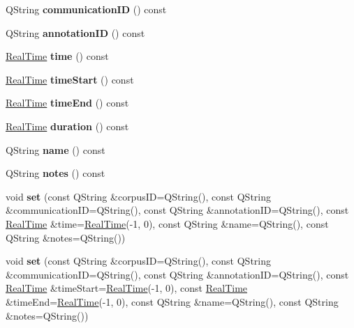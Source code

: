 \begin{DoxyCompactItemize}
Q\+String {\bfseries communication\+ID} () const
\item 
\mbox{\label{class_corpus_bookmark_ac10293f4e2033746d695c6349805fcba}} 
Q\+String {\bfseries annotation\+ID} () const
\item 
\mbox{\label{class_corpus_bookmark_a4567b01babc1074c21fd81fa4cf6b5bc}} 
\hyperlink{struct_real_time}{Real\+Time} {\bfseries time} () const
\item 
\mbox{\label{class_corpus_bookmark_a5954ecddfa90b9083ebca82ebf103d33}} 
\hyperlink{struct_real_time}{Real\+Time} {\bfseries time\+Start} () const
\item 
\mbox{\label{class_corpus_bookmark_ad4a33b45958e1a28eba0f659a94257f5}} 
\hyperlink{struct_real_time}{Real\+Time} {\bfseries time\+End} () const
\item 
\mbox{\label{class_corpus_bookmark_aecef3174b630fceda67dc4137f5ddcc4}} 
\hyperlink{struct_real_time}{Real\+Time} {\bfseries duration} () const
\item 
\mbox{\label{class_corpus_bookmark_a754ad425a41da641362b34452777c530}} 
Q\+String {\bfseries name} () const
\item 
\mbox{\label{class_corpus_bookmark_a08b19a694d6d4238342e09554eeb5735}} 
Q\+String {\bfseries notes} () const
\item 
\mbox{\label{class_corpus_bookmark_a3ad4e2e8fa63501f87b2f181bb125ddc}} 
void {\bfseries set} (const Q\+String \&corpus\+ID=Q\+String(), const Q\+String \&communication\+ID=Q\+String(), const Q\+String \&annotation\+ID=Q\+String(), const \hyperlink{struct_real_time}{Real\+Time} \&time=\hyperlink{struct_real_time}{Real\+Time}(-\/1, 0), const Q\+String \&name=Q\+String(), const Q\+String \&notes=Q\+String())
\item 
\mbox{\label{class_corpus_bookmark_af45e5143ac43cd79bec171d240d8ab88}} 
void {\bfseries set} (const Q\+String \&corpus\+ID=Q\+String(), const Q\+String \&communication\+ID=Q\+String(), const Q\+String \&annotation\+ID=Q\+String(), const \hyperlink{struct_real_time}{Real\+Time} \&time\+Start=\hyperlink{struct_real_time}{Real\+Time}(-\/1, 0), const \hyperlink{struct_real_time}{Real\+Time} \&time\+End=\hyperlink{struct_real_time}{Real\+Time}(-\/1, 0), const Q\+String \&name=Q\+String(), const Q\+String \&notes=Q\+String())

\end{DoxyCompactItemize}
